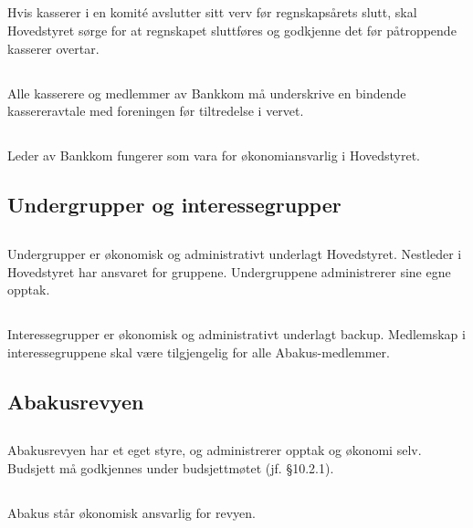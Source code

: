 \subsection{}
Hvis kasserer i en komité avslutter sitt verv før regnskapsårets slutt, skal Hovedstyret sørge for 
at regnskapet sluttføres og godkjenne det før påtroppende kasserer overtar.

\subsection{}
Alle kasserere og medlemmer av Bankkom må underskrive en bindende kassereravtale med foreningen 
før tiltredelse i vervet.

\subsection{}
Leder av Bankkom fungerer som vara for økonomiansvarlig i Hovedstyret.

\subsection{Undergrupper og interessegrupper}

\subsection{}
Undergrupper er økonomisk og administrativt underlagt Hovedstyret. Nestleder i
Hovedstyret har ansvaret for gruppene. Undergruppene administrerer sine egne
opptak.

\subsection{}
Interessegrupper er økonomisk og administrativt underlagt backup. Medlemskap i
interessegruppene skal være tilgjengelig for alle Abakus-medlemmer.

\subsection{Abakusrevyen}

\subsection{}
Abakusrevyen har et eget styre, og administrerer opptak og økonomi selv. Budsjett må godkjennes 
under budsjettmøtet (jf. §10.2.1).

\subsection{}
Abakus står økonomisk ansvarlig for revyen.
